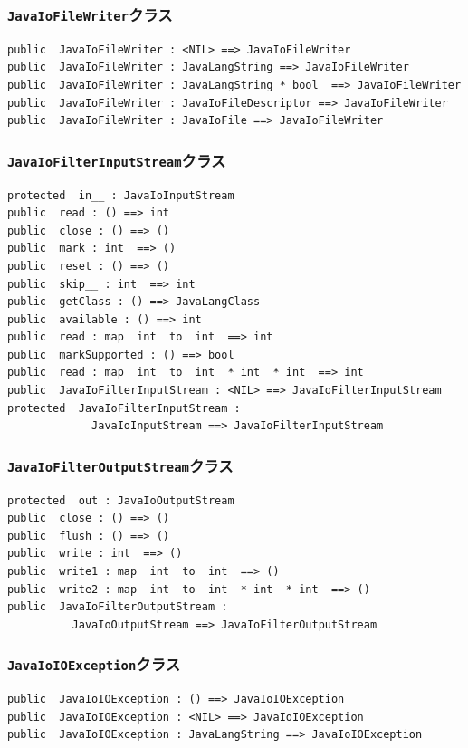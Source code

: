\documentclass[\pformat,12pt]{jarticle}
\begin{document}
\subsubsection{\texttt{JavaIoFileWriter}クラス}
\begin{small}
\begin{verbatim}
public  JavaIoFileWriter : <NIL> ==> JavaIoFileWriter
public  JavaIoFileWriter : JavaLangString ==> JavaIoFileWriter
public  JavaIoFileWriter : JavaLangString * bool  ==> JavaIoFileWriter
public  JavaIoFileWriter : JavaIoFileDescriptor ==> JavaIoFileWriter
public  JavaIoFileWriter : JavaIoFile ==> JavaIoFileWriter
\end{verbatim}
\end{small}

\subsubsection{\texttt{JavaIoFilterInputStream}クラス}
\begin{small}
\begin{verbatim}
protected  in__ : JavaIoInputStream
public  read : () ==> int
public  close : () ==> ()
public  mark : int  ==> ()
public  reset : () ==> ()
public  skip__ : int  ==> int
public  getClass : () ==> JavaLangClass
public  available : () ==> int
public  read : map  int  to  int  ==> int
public  markSupported : () ==> bool
public  read : map  int  to  int  * int  * int  ==> int
public  JavaIoFilterInputStream : <NIL> ==> JavaIoFilterInputStream
protected  JavaIoFilterInputStream : 
             JavaIoInputStream ==> JavaIoFilterInputStream
\end{verbatim}
\end{small}

\subsubsection{\texttt{JavaIoFilterOutputStream}クラス}
\begin{small}
\begin{verbatim}
protected  out : JavaIoOutputStream
public  close : () ==> ()
public  flush : () ==> ()
public  write : int  ==> ()
public  write1 : map  int  to  int  ==> ()
public  write2 : map  int  to  int  * int  * int  ==> ()
public  JavaIoFilterOutputStream : 
          JavaIoOutputStream ==> JavaIoFilterOutputStream
\end{verbatim}
\end{small}

\subsubsection{\texttt{JavaIoIOException}クラス}
\begin{small}
\begin{verbatim}
public  JavaIoIOException : () ==> JavaIoIOException
public  JavaIoIOException : <NIL> ==> JavaIoIOException
public  JavaIoIOException : JavaLangString ==> JavaIoIOException
\end{verbatim}
\end{small}
\end{document}
